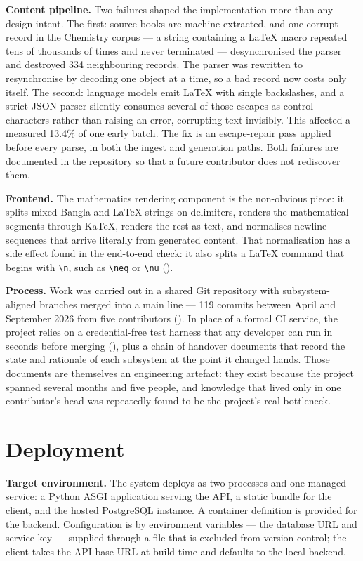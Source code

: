 \textbf{Content pipeline.} Two failures shaped the implementation more than any
design intent. The first: source books are machine-extracted, and one corrupt
record in the Chemistry corpus --- a string containing a \LaTeX{} macro repeated
tens of thousands of times and never terminated --- desynchronised the parser and
destroyed 334 neighbouring records. The parser was rewritten to resynchronise
by decoding one object at a time, so a bad record now costs only itself. The
second: language models emit \LaTeX{} with single backslashes, and a strict JSON
parser silently consumes several of those escapes as control characters rather
than raising an error, corrupting text invisibly. This affected a measured
13.4\% of one early batch. The fix is an escape-repair pass applied before every
parse, in both the ingest and generation paths. Both failures are documented in
the repository so that a future contributor does not rediscover them.

\textbf{Frontend.} The mathematics rendering component is the non-obvious piece:
it splits mixed Bangla-and-\LaTeX{} strings on delimiters, renders the
mathematical segments through KaTeX, renders the rest as text, and normalises
newline sequences that arrive literally from generated content. That
normalisation has a side effect found in the end-to-end check: it also splits a
\LaTeX{} command that begins with \verb|\n|, such as \verb|\neq| or \verb|\nu|
().

\textbf{Process.} Work was carried out in a shared Git repository with
subsystem-aligned branches merged into a main line --- 119 commits between
April and September 2026 from five contributors (). In place of a formal CI service,
the project relies on a credential-free test harness that any developer can run
in seconds before merging (), plus a chain of handover
documents that record the state and rationale of each subsystem at the point it
changed hands. Those documents are themselves an engineering artefact: they
exist because the project spanned several months and five people, and knowledge
that lived only in one contributor's head was repeatedly found to be the
project's real bottleneck.

\section{Deployment}
\label{sec:deployment}

\textbf{Target environment.} The system deploys as two processes and one managed
service: a Python ASGI application serving the API, a static bundle for the
client, and the hosted PostgreSQL instance. A container definition is provided
for the backend. Configuration is by environment variables --- the database URL
and service key --- supplied through a file that is excluded from version
control; the client takes the API base URL at build time and defaults to the
local backend.


